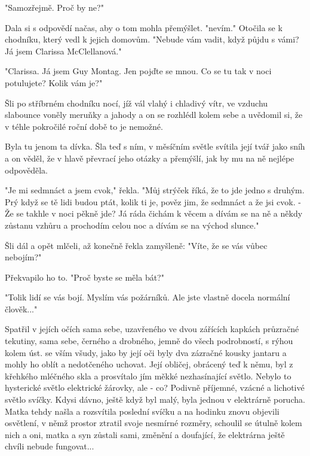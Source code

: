 \documentclass[11pt]{article}
\begin{document}
    "Samozřejmě. Proč by ne?"
    
    Dala si s odpovědí načas, aby o tom mohla přemýšlet. "nevím." Otočila se k chodníku, který vedl k jejich domovům. "Nebude vám vadit, když půjdu s vámi? Já jsem Clarissa McClellanová."
    
    "Clarissa. Já jsem Guy Montag. Jen pojďte se mnou. Co se tu tak v noci potulujete? Kolik vám je?"
    
    Šli po stříbrném chodníku nocí, jíž vál vlahý i chladivý vítr, ve vzduchu slabounce voněly meruňky a jahody a on se rozhlédl kolem sebe a uvědomil si, že v téhle pokročilé roční době to je nemožné.
    
    Byla tu jenom ta dívka. Šla teď s ním, v měsíčním světle svítila její tvář jako sníh a on věděl, že v hlavě převrací jeho otázky a přemýšlí, jak by mu na ně nejlépe odpověděla.
    
    "Je mi sedmnáct a jsem cvok," řekla. "Můj strýček říká, že to jde jedno s druhým. Prý když se tě lidi budou ptát, kolik ti je, pověz jim, že sedmnáct a že jsi cvok. - Že se takhle v noci pěkně jde? Já ráda čichám k věcem a dívám se na ně a někdy zůstanu vzhůru a prochodím celou noc a dívám se na východ slunce."
    
    Šli dál a opět mlčeli, až konečně řekla zamyšleně: "Víte, že se vás vůbec nebojím?"
    
    Překvapilo ho to. "Proč byste se měla bát?"
    
    "Tolik lidí se vás bojí. Myslím vás požárníků. Ale jste vlastně docela normální člověk..."
    
    Spatřil v jejích očích sama sebe, uzavřeného ve dvou zářících kapkách průzračné tekutiny, sama sebe, černého a drobného, jemně do všech podrobností, s rýhou kolem úst. se vším všudy, jako by její oči byly dva zázračné kousky jantaru a mohly ho oblít a nedotčeného uchovat. Její obličej, obrácený teď k němu, byl z křehkého mléčného skla a prosvítalo jím měkké nezhasínající světlo. Nebylo to hysterické světlo elektrické žárovky, ale - co? Podivně příjemné, vzácné a lichotivé světlo svíčky. Kdysi dávno, ještě když byl malý, byla jednou v elektrárně porucha. Matka tehdy našla a rozsvítila poslední svíčku a na hodinku znovu objevili osvětlení, v němž prostor ztratil svoje nesmírné rozměry, schoulil se útulně kolem nich a oni, matka a syn zůstali sami, změnění a doufající, že elektrárna ještě chvíli nebude fungovat...
    \newpage
\end{document}
